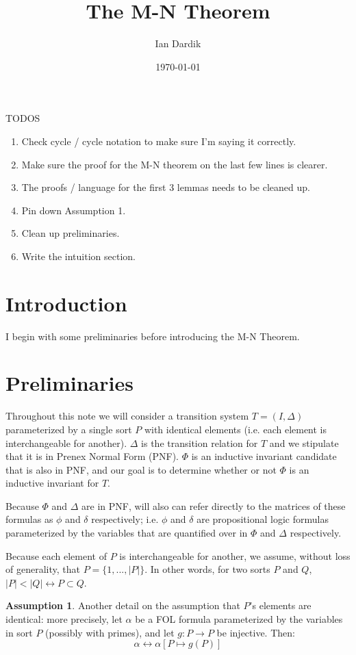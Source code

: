 \documentclass[12pt]{article}
\title{The M-N Theorem}
\author{Ian Dardik}
\date{\today}
\theoremstyle{definition}
\newtheorem{assumption}{Assumption}
\theoremstyle{remark}
\begin{document}
\maketitle

\noindent TODOS
\begin{enumerate}
  \item Check cycle / cycle notation to make sure I'm saying it correctly.
  \item Make sure the proof for the M-N theorem on the last few lines is clearer.
  \item The proofs / language for the first 3 lemmas needs to be cleaned up.
  \item Pin down Assumption 1.
  \item Clean up preliminaries.
  \item Write the intuition section.
\end{enumerate}

\section{Introduction}
I begin with some preliminaries before introducing the M-N Theorem.


\section{Preliminaries}
Throughout this note we will consider a transition system $T=(I,\Delta)$ parameterized by a single sort $P$ with identical elements (i.e. each element is interchangeable for another).  $\Delta$ is the transition relation for $T$ and we stipulate that it is in Prenex Normal Form (PNF).  $\Phi$ is an inductive invariant candidate that is also in PNF, and our goal is to determine whether or not $\Phi$ is an inductive invariant for $T$.

Because $\Phi$ and $\Delta$ are in PNF, will also can refer directly to the matrices of these formulas as $\phi$ and $\delta$ respectively; i.e. $\phi$ and $\delta$ are propositional logic formulas parameterized by the variables that are quantified over in $\Phi$ and $\Delta$ respectively.

Because each element of $P$ is interchangeable for another, we assume, without loss of generality, that $P = \{1,...,|P|\}$.  In other words, for two sorts $P$ and $Q$, $|P| < |Q| \leftrightarrow P \subset Q$.

\begin{assumption}
  \label{asmp:perm}
  Another detail on the assumption that $P$'s elements are identical: more precisely, let $\alpha$ be a FOL formula parameterized by the variables in sort $P$ (possibly with primes), and let $g : P \to P$ be injective.  Then:
  $$\alpha \leftrightarrow \alpha[P \mapsto g(P)]$$
\end{assumption}
\end{document}
